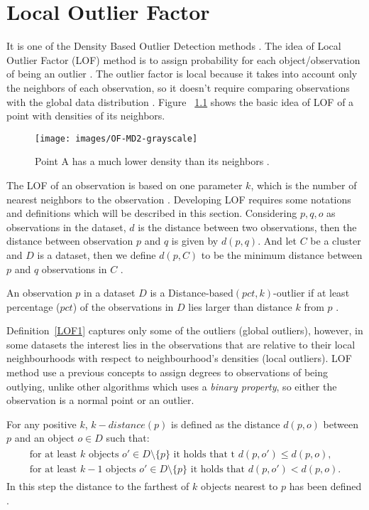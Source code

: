\chapter{Local Outlier Factor} \label{LOF} \label{Local_Outlier_Factor}
It is one of the Density Based Outlier Detection methods \citep{Silvia}. The idea of Local Outlier Factor (LOF) method is to assign probability for each object/observation of being an outlier \citep{Markus}. The outlier factor is local because it takes into account only the neighbors of each observation, so it doesn't require comparing observations with the global data distribution \citep{LOF}. Figure ~\ref{LOF-MD2} shows the basic idea of LOF of a point with densities of its neighbors.
 \begin{figure}[!h]
 \centering 
 \texttt{[image: images/OF-MD2-grayscale]}
 \caption{Point A has a much lower density than its neighbors \citep{LOF}.}
 \label{LOF-MD2} 
 \end{figure}
 
The LOF of an observation is based on one parameter $k$, which is the number of nearest neighbors to the observation \citep{Markus}. Developing LOF requires some notations and definitions which will be described in this section. Considering $p,q,o$ as observations in the dataset, $d$ is the distance between two observations, then the distance between observation $p$ and $q$ is given by $d(p,q)$. And let $C$ be a cluster and $D$ is a dataset, then we define $d(p,C)$ to be the minimum distance between $p$ and $q$ observations in $C$ \citep{Knorr}.

\begin{defn} \label{LOF1} An observation $p$ in a dataset $D$ is a Distance-based$(pct,k)$-outlier if at least percentage ($pct$) of the observations in $D$ lies larger than distance $k$ from $p$ \citep{Markus}.
\end{defn}
Definition~\ref{LOF1} captures only some of the outliers (global outliers), however, in some datasets the interest lies in the observations that are relative to their local neighbourhoods with respect to neighbourhood's densities (local outliers). LOF method use a previous concepts to assign degrees to observations of being outlying, unlike other algorithms which uses a \textit{binary property}, so either the observation is a normal point or an outlier.
\begin{defn} \label{LOF2} For any positive $k$, $k-distance(p)$ is defined as the distance $d(p,o)$ between $p$ and an object $o \in D$ such that:
\begin{align}
\label{a}
\begin{gathered}
\text{for at least $k$ objects } o' \in D \setminus \{p\} \text{ it holds that t } d(p,o') \leq d(p,o), \\ \text{for at least $k-1$ objects } o' \in D \setminus \{p\} \text{ it holds that } d(p,o') < d(p,o).
\end{gathered} 
\end{align}
In this step the distance to the farthest of $k$ objects nearest to $p$ has been defined \citep{Markus}.
\end{defn}

